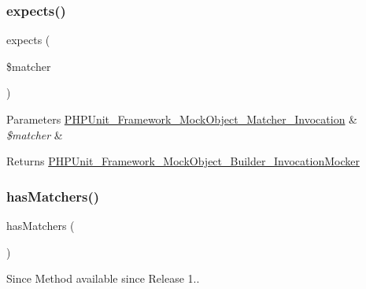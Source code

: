 \subsubsection{\texorpdfstring{expects()}{expects()}}
{\footnotesize\ttfamily expects (\begin{DoxyParamCaption}\item[{\mbox{\hyperlink{interface_p_h_p_unit___framework___mock_object___matcher___invocation}{P\+H\+P\+Unit\+\_\+\+Framework\+\_\+\+Mock\+Object\+\_\+\+Matcher\+\_\+\+Invocation}}}]{\$matcher }\end{DoxyParamCaption})}


\begin{DoxyParams}[1]{Parameters}
\mbox{\hyperlink{interface_p_h_p_unit___framework___mock_object___matcher___invocation}{P\+H\+P\+Unit\+\_\+\+Framework\+\_\+\+Mock\+Object\+\_\+\+Matcher\+\_\+\+Invocation}} & {\em \$matcher} & \\
\hline
\end{DoxyParams}
\begin{DoxyReturn}{Returns}
\mbox{\hyperlink{class_p_h_p_unit___framework___mock_object___builder___invocation_mocker}{P\+H\+P\+Unit\+\_\+\+Framework\+\_\+\+Mock\+Object\+\_\+\+Builder\+\_\+\+Invocation\+Mocker}} 
\end{DoxyReturn}
\mbox{\label{class_p_h_p_unit___framework___mock_object___invocation_mocker_a81f246fc919f5043e206cc59f9bd3ed1}} 
\subsubsection{\texorpdfstring{has\+Matchers()}{hasMatchers()}}
{\footnotesize\ttfamily has\+Matchers (\begin{DoxyParamCaption}{ }\end{DoxyParamCaption})}

\begin{DoxySince}{Since}
Method available since Release 1.. 
\end{DoxySince}
\mbox{\label{class_p_h_p_unit___framework___mock_object___invocation_mocker_af2fc26e6704e08d95f2ea1d9c5ffb865}} 
